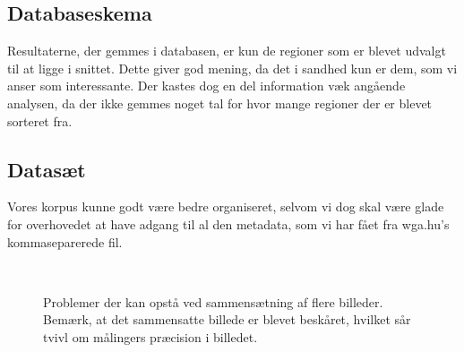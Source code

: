 {\subsection{Databaseskema}
Resultaterne, der gemmes i databasen, er kun de regioner som er blevet
udvalgt til at ligge i snittet. Dette giver god mening, da det i sandhed
kun er dem, som vi anser som interessante. Der kastes dog en del
information væk angående analysen, da der ikke gemmes noget tal for hvor
mange regioner der er blevet sorteret fra.

\subsection{Datasæt}
Vores korpus kunne godt være bedre organiseret, selvom vi dog skal være
glade for overhovedet at have adgang til al den metadata, som vi har
fået fra wga.hu's kommaseparerede fil.

\begin{figure}[!h]
    \centering
    \\
    \caption[]{Problemer der kan opstå ved sammensætning af flere
    billeder. Bemærk, at det sammensatte billede er blevet beskåret,
    hvilket sår tvivl om målingers præcision i billedet.}
    \label{fucked_sammensaetning}
\end{figure}

}
